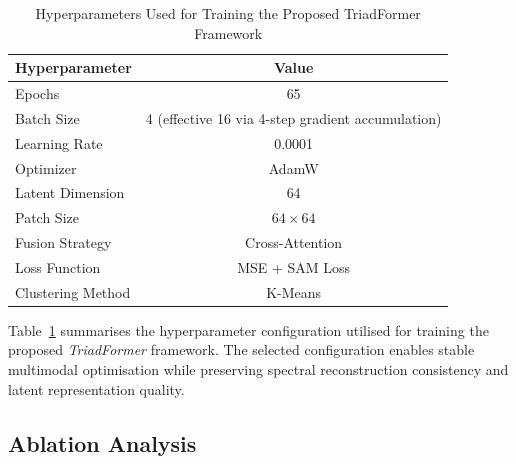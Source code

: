 \documentclass[pdflatex,sn-mathphys-num]{sn-jnl}
\begin{document}

\begin{table}[!t]
\caption{Hyperparameters Used for Training the Proposed TriadFormer Framework}
\label{tab:hyperparameters}
\centering
\small
\renewcommand{\arraystretch}{1.1}
\begin{tabular}{lc}
\toprule
\textbf{Hyperparameter} & \textbf{Value} \\
\midrule
Epochs & 65 \\
Batch Size & 4 (effective 16 via 4-step gradient accumulation) \\
Learning Rate & 0.0001 \\
Optimizer & AdamW \\
Latent Dimension & 64 \\
Patch Size & \(64 \times 64\) \\
Fusion Strategy & Cross-Attention \\
Loss Function & MSE + SAM Loss \\
Clustering Method & K-Means \\
\bottomrule
\end{tabular}
\end{table}

Table~\ref{tab:hyperparameters} summarises the hyperparameter configuration utilised for training the proposed \textit{TriadFormer} framework. The selected configuration enables stable multimodal optimisation while preserving spectral reconstruction consistency and latent representation quality.

\subsection{Ablation Analysis}
\label{sec:ablation}
\end{document}
